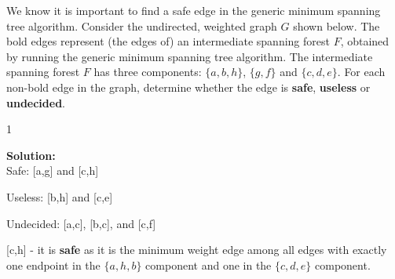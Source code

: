 \documentclass[9pt]{article}
\def\solutions{1}
\begin{document}
\vspace{5mm}

\item 
We know it is important to find a safe edge in the generic minimum spanning tree algorithm. Consider the undirected, weighted graph $G$ shown below. The bold edges represent (the edges of) an intermediate spanning forest $F$, obtained by running the generic minimum spanning tree algorithm. The intermediate spanning forest $F$ has three components: $\{a,b,h\}$, $\{g,f\}$ and $\{c,d,e\}$.
For each non-bold edge in the graph, determine whether the edge is \textbf{safe}, \textbf{useless} or \textbf{undecided}.  
\begin{center}
\end{center}

\if\solutions1
\vspace{2mm}

\textbf{Solution:} \\
Safe: [a,g] and [c,h]

Useless: [b,h] and [c,e] 

Undecided: [a,c], [b,c], and [c,f]

\vspace{5mm}

[c,h] - it is \textbf{safe} as it is the minimum weight edge among all edges with exactly one
endpoint in the $\{a,h,b\}$ component and one in the $\{c,d,e\}$ component.
\end{document}
